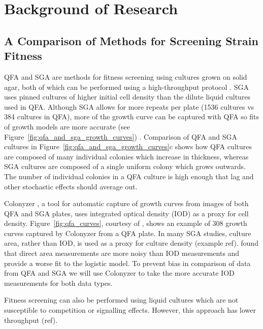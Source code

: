 \graphicspath{{images_low_res/}}

\section{Background of Research}
\label{sec:background}

\subsection{A Comparison of Methods for Screening Strain Fitness }

QFA and SGA are methods for fitness screening using cultures grown on solid agar, both of
which can be performed using a high-throughput protocol \citet{Baryshnikova2010sga,Banks2012}. SGA
uses pinned cultures of higher initial cell density than the dilute liquid cultures used
in QFA. Although SGA allows for more repeats per plate (1536 cultures vs 384 cultures in
QFA), more of the growth curve can be captured with QFA so fits of growth models are more
accurate (see Figure~\ref{fig:qfa_and_sga_growth_curves}) \citep{Lawless2010}.
Comparison of QFA and SGA cultures in Figure~\ref{fig:qfa_and_sga_growth_curves}c shows
how QFA cultures are composed of many individual colonies which increase in thickness,
whereas SGA cultures are composed of a single uniform colony which grows outwards. The
number of individual colonies in a QFA culture is high enough that lag and other
stochastic effects should average out.

Colonyzer \citep{Lawless2010}, a tool for automatic capture of growth curves from images
of both QFA and SGA plates, uses integrated optical density (IOD) as a proxy for cell
density. Figure~\ref{fig:qfa_curves}, courtesy of \citet{Banks2012}, shows an example of
308 growth curves captured by Colonyzer from a QFA plate. In many SGA studies, culture
area, rather than IOD, is used as a proxy for culture density (example
ref). \cite{Lawless2010} found that direct area measurements are more noisy than IOD
measurements and provide a worse fit to the logistic model. To prevent bias in comparison
of data from QFA and SGA we will use Colonyzer to take the more accurate IOD measurements
for both data types.

Fitness screening can also be performed using liquid cultures which are not susceptible to
competition or signalling effects. However, this approach has lower throughput (ref).

